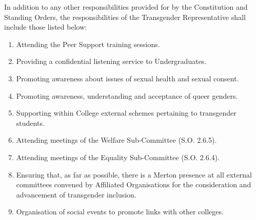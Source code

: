 \npara In addition to any other responsibilities provided for by the Constitution and Standing Orders, the responsibilities of the Transgender Representative shall include those listed below:
\begin{enumerate}
	\item Attending the Peer Support training sessions.
	\item Providing a confidential listening service to Undergraduates.
	\item Promoting awareness about issues of sexual health and sexual consent. 
	\item Promoting awareness, understanding and acceptance of queer genders. 
	\item Supporting within College external schemes pertaining to transgender students. 
	\item Attending meetings of the Welfare Sub-Committee (S.O. 2.6.5). 
	\item Attending meetings of the Equality Sub-Committee (S.O. 2.6.4). 
	\item Ensuring that, as far as possible, there is a Merton presence at all external committees convened by Affiliated Organisations for the consideration and advancement of transgender inclusion. 
	\item Organisation of social events to promote links with other colleges.
\end{enumerate}



